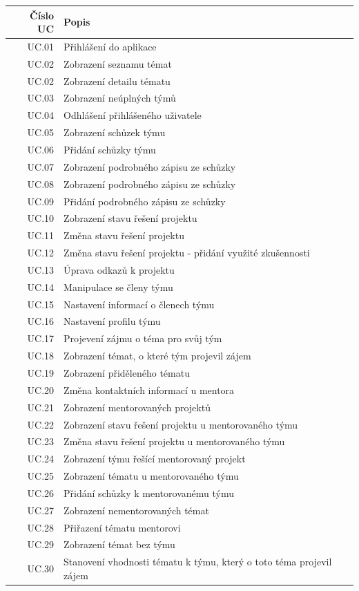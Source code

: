 \documentclass[czech,BP]{thesiskiv}
\begin{document}
{\begin{table}[]
	\caption{Seznam případů užití}
	\label{tab:use-case-table}
	\centering
	\begin{xltabular}{\textwidth}{|r|X|}\hline
		Číslo UC & Popis\\\hline\hline
		UC.01	& Přihlášení do aplikace\\\hline
		UC.02	& Zobrazení seznamu témat\\\hline
		UC.02	& Zobrazení detailu tématu\\\hline
		UC.03	& Zobrazení neúplných týmů\\\hline
		UC.04	& Odhlášení přihlášeného uživatele\\\hline
		UC.05	& Zobrazení schůzek týmu\\\hline
		UC.06	& Přidání schůzky týmu\\\hline
		UC.07	& Zobrazení podrobného zápisu ze schůzky\\\hline
		UC.08	& Zobrazení podrobného zápisu ze schůzky\\\hline
		UC.09	& Přidání podrobného zápisu ze schůzky\\\hline
		UC.10	& Zobrazení stavu řešení projektu\\\hline
		UC.11	& Změna stavu řešení projektu\\\hline
		UC.12	& Změna stavu řešení projektu - přidání využité zkušennosti\\\hline
		UC.13	& Úprava odkazů k projektu\\\hline
		UC.14	& Manipulace se členy týmu\\\hline
		UC.15	& Nastavení informací o členech týmu\\\hline
		UC.16	& Nastavení profilu týmu\\\hline
		UC.17	& Projevení zájmu o téma pro svůj tým\\\hline
		UC.18	& Zobrazení témat, o které tým projevil zájem\\\hline
		UC.19	& Zobrazení přiděleného tématu\\\hline
		UC.20	& Změna kontaktních informací u mentora\\\hline
		UC.21	& Zobrazení mentorovaných projektů\\\hline
		UC.22	& Zobrazení stavu řešení projektu u mentorovaného týmu\\\hline
		UC.23	& Změna stavu řešení projektu u mentorovaného týmu\\\hline
		UC.24	& Zobrazení týmu řešící mentorovaný projekt\\\hline
		UC.25	& Zobrazení tématu u mentorovaného týmu\\\hline
		UC.26	& Přidání schůzky k mentorovanému týmu\\\hline
		UC.27	& Zobrazení nementorovaných témat\\\hline
		UC.28	& Přiřazení tématu mentorovi\\\hline
		UC.29	& Zobrazení témat bez týmu\\\hline
		UC.30	& Stanovení vhodnosti tématu k týmu, který o toto téma projevil zájem\\\hline 
	\end{xltabular}


\end{table}}
\end{document}
